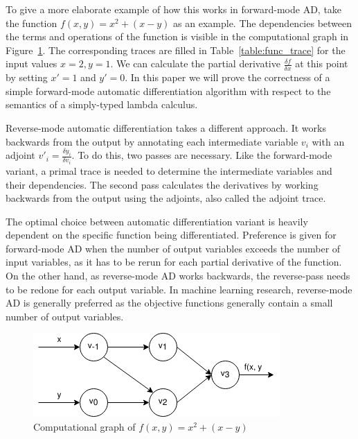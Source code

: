To give a more elaborate example of how this works in forward-mode AD, take the function $f(x, y) = x^2 + (x - y)$ as an example.
The dependencies between the terms and operations of the function is visible in the computational graph in Figure~\ref{fig:func_trace}.
The corresponding traces are filled in Table~\ref{table:func_trace} for the input values $x = 2, y = 1$.
We can calculate the partial derivative $\frac{\delta f}{\delta x}$ at this point by setting $x' = 1$ and $y' = 0$.
In this paper we will prove the correctness of a simple forward-mode automatic differentiation algorithm with respect to the semantics of a simply-typed lambda calculus.

Reverse-mode automatic differentiation takes a different approach.
It works backwards from the output by annotating each intermediate variable $v_i$ with an adjoint $v'_i=\frac{\delta y_i}{\delta v_i}$.
To do this, two passes are necessary.
Like the forward-mode variant, a primal trace is needed to determine the intermediate variables and their dependencies.
The second pass calculates the derivatives by working backwards from the output using the adjoints, also called the adjoint trace.

The optimal choice between automatic differentiation variant is heavily dependent on the specific function being differentiated.
Preference is given for forward-mode AD when the number of output variables exceeds the number of input variables, as it has to be rerun for each partial derivative of the function.
On the other hand, as reverse-mode AD works backwards, the reverse-pass needs to be redone for each output variable.
In machine learning research, reverse-mode AD is generally preferred as the objective functions generally contain a small number of output variables.


\begin{figure}
  \centering
  \includegraphics[scale=0.6]{./assets/function_trace.png}
  \caption{Computational graph of $f(x, y) = x^2 + (x - y)$}
  \label{fig:func_trace}
\end{figure}

